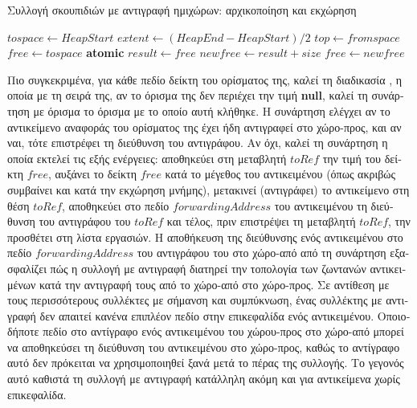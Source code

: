\begin{greek}
\begin{algorithm}
  \caption{Συλλογή σκουπιδιών με αντιγραφή ημιχώρων: αρχικοποίηση και εκχώρηση}
  \label{alg:cop_1}
  \begin{algorithmic}[1]
      \State $tospace \gets HeapStart$
      \State $extent \gets (HeapEnd-HeapStart)/2$ 
      \State $top \gets fromspace$
      \State $free \gets tospace$
    \EndProcedure
    \Statex
      \State \textbf{atomic}
      \State $result \gets free$
      \State $newfree \gets result + size$
        \State {} 
      \EndIf
      \State $free \gets newfree$
      \State {}
    \EndFunction
  \end{algorithmic}
\end{algorithm}

Πιο συγκεκριμένα, 
για κάθε πεδίο δείκτη του ορίσματος της, καλεί τη διαδικασία 
\textenglish{}, η οποία με τη σειρά της, αν το όρισμα της 
δεν περιέχει την τιμή \textbf{null}, καλεί τη συνάρτηση \textenglish{} 
με όρισμα το όρισμα με το οποίο αυτή κλήθηκε. Η συνάρτηση \textenglish{} 
ελέγχει αν το αντικείμενο αναφοράς του ορίσματος της έχει ήδη 
αντιγραφεί στο χώρο-προς, και αν ναι, τότε επιστρέφει τη διεύθυνση 
του αντιγράφου. Αν όχι, καλεί τη συνάρτηση \textenglish{} η 
οποία εκτελεί τις εξής ενέργειες: αποθηκεύει στη μεταβλητή $toRef$ 
την τιμή του δείκτη $free$, αυξάνει το δείκτη $free$ κατά το 
μέγεθος του αντικειμένου (όπως ακριβώς συμβαίνει και κατά την 
εκχώρηση μνήμης), μετακινεί (αντιγράφει) το αντικείμενο στη θέση 
$toRef$, αποθηκεύει στο πεδίο $forwardingAddress$ του αντικειμένου 
τη διεύθυνση του αντιγράφου του $toRef$ και τέλος, πριν επιστρέψει
τη μεταβλητή $toRef$, την προσθέτει στη λίστα εργασιών. Η αποθήκευση 
της διεύθυνσης ενός αντικειμένου στο πεδίο $forwardingAddress$ 
του αντιγράφου του στο χώρο-από από τη συνάρτηση \textenglish{} 
εξασφαλίζει πώς η συλλογή με αντιγραφή διατηρεί την τοπολογία των 
ζωντανών αντικειμένων κατά την αντιγραφή τους από το χώρο-από στο
χώρο-προς. Σε αντίθεση με τους περισσότερους συλλέκτες με σήμανση 
και συμπύκνωση, ένας συλλέκτης με αντιγραφή δεν απαιτεί κανένα 
επιπλέον πεδίο στην επικεφαλίδα ενός αντικειμένου. Οποιοδήποτε 
πεδίο στο αντίγραφο ενός αντικειμένου του χώρου-προς στο χώρο-από 
μπορεί να αποθηκεύσει τη διεύθυνση του αντικειμένου στο χώρο-προς, 
καθώς το αντίγραφο αυτό δεν πρόκειται να χρησιμοποιηθεί ξανά 
μετά το πέρας της συλλογής. Το γεγονός αυτό καθιστά τη συλλογή 
με αντιγραφή κατάλληλη ακόμη και για αντικείμενα χωρίς επικεφαλίδα.


\end{greek}
